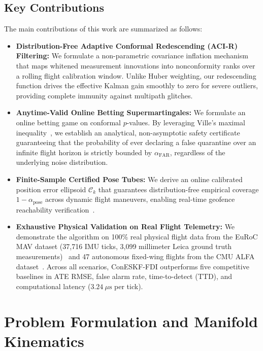 \documentclass[journal,twocolumn]{IEEEtran}
\begin{document}
\subsection{Key Contributions}
The main contributions of this work are summarized as follows:
\begin{itemize}
    \item \textbf{Distribution-Free Adaptive Conformal Redescending (ACI-R) Filtering:} We formulate a non-parametric covariance inflation mechanism that maps whitened measurement innovations into nonconformity ranks over a rolling flight calibration window. Unlike Huber weighting, our redescending function drives the effective Kalman gain smoothly to zero for severe outliers, providing complete immunity against multipath glitches.
    \item \textbf{Anytime-Valid Online Betting Supermartingales:} We formulate an online betting game on conformal $p$-values. By leveraging Ville's maximal inequality~\cite{ville1939etude}, we establish an analytical, non-asymptotic safety certificate guaranteeing that the probability of ever declaring a false quarantine over an infinite flight horizon is strictly bounded by $\alpha_{\mathrm{FAR}}$, regardless of the underlying noise distribution.
    \item \textbf{Finite-Sample Certified Pose Tubes:} We derive an online calibrated position error ellipsoid $\mathcal{C}_k$ that guarantees distribution-free empirical coverage $1 - \alpha_{\mathrm{pose}}$ across dynamic flight maneuvers, enabling real-time geofence reachability verification~\cite{althoff2021set}.
    \item \textbf{Exhaustive Physical Validation on Real Flight Telemetry:} We demonstrate the algorithm on 100\% real physical flight data from the EuRoC MAV dataset (37,716 IMU ticks, 3,099 millimeter Leica ground truth measurements)~\cite{burri2016euroc} and 47 autonomous fixed-wing flights from the CMU ALFA dataset~\cite{ke2021alfa,gross2016flight}. Across all scenarios, ConESKF-FDI outperforms five competitive baselines in ATE RMSE, false alarm rate, time-to-detect (TTD), and computational latency ($3.24\ \mu\text{s}$ per tick).
\end{itemize}

\section{Problem Formulation and Manifold Kinematics}
\label{sec:formulation}
\end{document}
